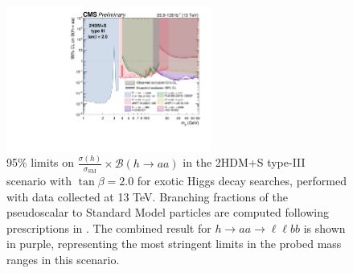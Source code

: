   \begin{figure}[ht]
    \begin{center}
      \includegraphics[width=0.6\textwidth]{figures/ch-13-results/summary_plot_full_run2_plot_BRaa_Type3_tanbeta2.pdf}
    \end{center}
    \caption[95\% limits on $\frac{\sigma(h)}{\sigma_{\text{SM}}} \times \mathcal{B}(h \rightarrow aa)$ in the 2HDM+S type-III scenario with $\tan\beta = 2.0$ for exotic Higgs decay searches, performed with data collected at 13 TeV.]{95\% limits on $\frac{\sigma(h)}{\sigma_{\text{SM}}} \times \mathcal{B}(h \rightarrow aa)$ in the 2HDM+S type-III scenario with $\tan\beta = 2.0$ for exotic Higgs decay searches, performed with data collected at 13 TeV. Branching fractions of the pseudoscalar to Standard Model particles are computed following prescriptions in \cite{curtin_exotic_2014}. The combined result for $h\rightarrow aa \rightarrow \ell\ell bb$ \cite{CMS-HIG-22-007} is shown in purple, representing the most stringent limits in the probed mass ranges in this scenario.}
      \label{fig:summary_plot_typeIII_tan_beta_2p0}
  \end{figure}
  
